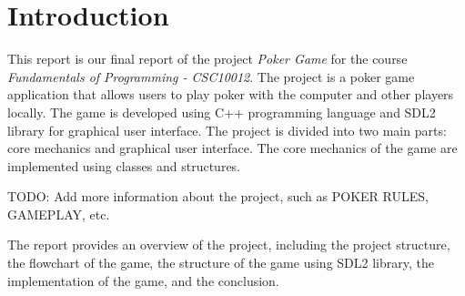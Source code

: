 \section{Introduction}
\label{sec:introduction}

\hspace{1cm} This report is our final report of the project \textit{Poker Game} for the course \textit{Fundamentals of Programming - CSC10012}. The project is a poker game application that allows users to play poker with the computer and other players locally. The game is developed using C++ programming language and SDL2 library for graphical user interface. The project is divided into two main parts: core mechanics and graphical user interface. The core mechanics of the game are implemented using classes and structures.

\vspace{0.5cm}

\hspace{1cm} TODO: Add more information about the project, such as POKER RULES, GAMEPLAY, etc.

\vspace{0.5cm}

\hspace{1cm} The report provides an overview of the project, including the project structure, the flowchart of the game, the structure of the game using SDL2 library, the implementation of the game, and the conclusion.

